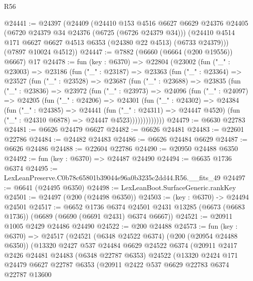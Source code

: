 \begin{lexlean}{R56}
\begin{coremodule}
@24441 := @24397
    (@24409
      (@24410
        @153
        @4516
        @6627
        @6629
        @24376
        @24405
        (@6720 @24379 @34 @24376 (@6725 (@6726 @24379 @34)))
        (@24410 @4514 @171 @6627 @6627 @4513 @6353 (@24380 @22 @4513) (@6733 @24379)))
      (@7897 @10024 @4512))
@24447 := @7882 (@6660 (@6664 (@200 @19556)) @6667) @17
@24478 := fun (key : @6370) =>
  @22804
    (@23002
      (fun ("_" : @23003) =>
      @23186
        (fun ("_" : @23187) =>
        @23363
          (fun ("_" : @23364) =>
          @23527
            (fun ("_" : @23528) =>
            @23687
              (fun ("_" : @23688) =>
              @23835
                (fun ("_" : @23836) =>
                @23972
                  (fun ("_" : @23973) =>
                  @24096
                    (fun ("_" : @24097) =>
                    @24205
                      (fun ("_" : @24206) =>
                      @24301
                        (fun ("_" : @24302) =>
                        @24384
                          (fun ("_" : @24385) =>
                          @24441
                            (fun ("_" : @24311) => @24447 @4520)
                            (fun ("_" : @24310 @6878) => @24447 @4523)))))))))))))
@24479 := @6630 @22783
@24481 := @6626 @24479 @6627
@24482 := @6626 @24481
@24483 := @22601 @22786
@24484 := @24482 @24483
@24486 := @6626 @24484 @6629
@24487 := @6626 @24486
@24488 := @22604 @22786
@24490 := @20950 @24488 @6350
@24492 := fun (key : @6370) => @24487 @24490
@24494 := @6635 @1736 @6374
@24495 := LexLeanPreserve.C0b78c65801b39044e96a0b3235c2dd44.R56.__fits_49
@24497 := @6641 (@24495 @6350)
@24498 := LexLeanBoot.SurfaceGeneric.rankKey
@24501 := @24497 (@200 (@24498 @6350))
@24503 := (key : @6370) -> @24494 @24501
@24517 := @6652
    @1736
    @6374
    @24501
    @2431
    @13285
    (@6673 (@6683 @1736))
    (@6689 (@6690 (@6691 @2431) @6374 @6667))
@24521 := @20911 @1005 @2429 @24486 @24490
@24522 := @200 @24488
@24573 := fun (key : @6370) =>
  @24517
    (@24521
      (@6348 @24522 @6374)
      (@200 (@20954 @24488 @6350))
      (@13320
        @2427
        @537
        @24484
        @6629
        @24522
        @6374
        (@20911
          @2417
          @2426
          @24481
          @24483
          (@6348 @22787 @6353)
          @24522
          (@13320
            @2424
            @171
            @24479
            @6627
            @22787
            @6353
            (@20911
              @2422
              @537
              @6629
              @22783
              @6374
              @22787
              @13600

\end{coremodule}
\end{lexlean}
